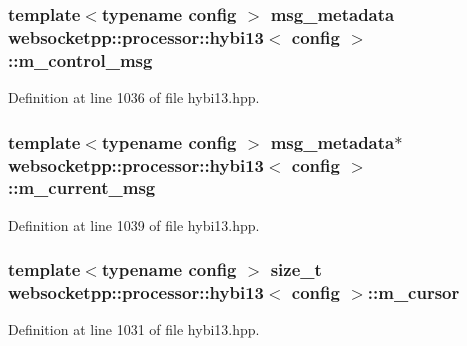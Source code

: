 \subsubsection[{m\+\_\+control\+\_\+msg}]{\setlength{\rightskip}{0pt plus 5cm}template$<$typename config $>$ {\bf msg\+\_\+metadata} {\bf websocketpp\+::processor\+::hybi13}$<$ config $>$\+::m\+\_\+control\+\_\+msg\hspace{0.3cm}{\ttfamily [protected]}}\label{classwebsocketpp_1_1processor_1_1hybi13_a684c7ab5a31c2becad136063e0cd48a9}


Definition at line 1036 of file hybi13.\+hpp.

\hypertarget{classwebsocketpp_1_1processor_1_1hybi13_a2a1554b49e53c61931e6912bec35c815}{}
\subsubsection[{m\+\_\+current\+\_\+msg}]{\setlength{\rightskip}{0pt plus 5cm}template$<$typename config $>$ {\bf msg\+\_\+metadata}$\ast$ {\bf websocketpp\+::processor\+::hybi13}$<$ config $>$\+::m\+\_\+current\+\_\+msg\hspace{0.3cm}{\ttfamily [protected]}}\label{classwebsocketpp_1_1processor_1_1hybi13_a2a1554b49e53c61931e6912bec35c815}


Definition at line 1039 of file hybi13.\+hpp.

\hypertarget{classwebsocketpp_1_1processor_1_1hybi13_a4fd9db5f39ff7ca0796c456b83b74887}{}
\subsubsection[{m\+\_\+cursor}]{\setlength{\rightskip}{0pt plus 5cm}template$<$typename config $>$ size\+\_\+t {\bf websocketpp\+::processor\+::hybi13}$<$ config $>$\+::m\+\_\+cursor\hspace{0.3cm}{\ttfamily [protected]}}\label{classwebsocketpp_1_1processor_1_1hybi13_a4fd9db5f39ff7ca0796c456b83b74887}


Definition at line 1031 of file hybi13.\+hpp.

